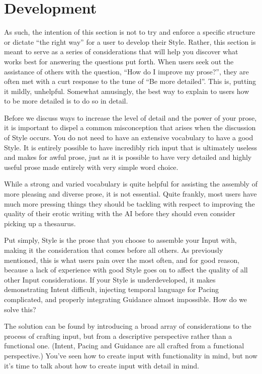 \documentclass[Source-main.tex]{subfiles}
\begin{document}
\section{Development}
\label{sec:stdevelop}

As such, the intention of this section is not to try and enforce a specific structure or dictate “the right way” for a user to develop their Style.
Rather, this section is meant to serve as a series of considerations that will help you discover what works best for answering the questions put forth.
When users seek out the assistance of others with the question, “How do I improve my prose?”, they are often met with a curt response to the tune of “Be more detailed”.
This is, putting it mildly, unhelpful.
Somewhat amusingly, the best way to explain to users how to be more detailed is to do so in detail.

Before we discuss ways to increase the level of detail and the power of your prose, it is important to dispel a common misconception that arises when the discussion of Style occurs.
You do not need to have an extensive vocabulary to have a good Style.
It is entirely possible to have incredibly rich input that is ultimately useless and makes for awful prose, just as it is possible to have very detailed and highly useful prose made entirely with very simple word choice.

While a strong and varied vocabulary is quite helpful for assisting the assembly of more pleasing and diverse prose, it is not essential.
Quite frankly, most users have much more pressing things they should be tackling with respect to improving the quality of their erotic writing with the AI before they should even consider picking up a thesaurus.

Put simply, Style is the prose that you choose to assemble your Input with, making it the consideration that comes before all others.
As previously mentioned, this is what users pain over the most often, and for good reason, because a lack of experience with good Style goes on to affect the quality of all other Input considerations.
If your Style is underdeveloped, it makes demonstrating Intent difficult, injecting temporal language for Pacing complicated, and properly integrating Guidance almost impossible.
How do we solve this?

The solution can be found by introducing a broad array of considerations to the process of crafting input, but from a descriptive perspective rather than a functional one.
(Intent, Pacing and Guidance are all crafted from a functional perspective.)
You’ve seen how to create input with functionality in mind, but now it’s time to talk about how to create input with detail in mind.
\end{document}
